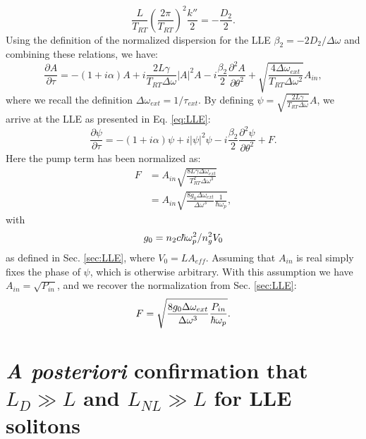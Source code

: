 \begin{equation}
\frac{L}{T_{RT}}\left(\frac{2\pi}{T_{RT}}\right)^2\frac{k''}{2}=-\frac{D_2}{2}.
\end{equation}
Using the definition of the normalized dispersion for the LLE $\beta_2=-2D_2/\Delta\omega$ and combining these relations, we have:
\begin{equation}
\frac{\partial A}{\partial\tau}=-(1+i\alpha)A+i\frac{2L\gamma}{T_{RT}\Delta\omega}|A|^2A-i\frac{\beta_2}{2}\frac{\partial^2 A}{\partial\theta^2} +\sqrt{\frac{4\Delta\omega_{ext}}{T_{RT}\Delta\omega^2}}A_{in},
\end{equation}
where we recall the definition $\Delta\omega_{ext}=1/\tau_{ext}$. By defining $\psi=\sqrt{\frac{2L\gamma}{T_{RT}\Delta\omega}}A$, we arrive at the LLE as presented in Eq. \ref{eq:LLE}:
\begin{equation}
\frac{\partial \psi}{\partial \tau}=-(1+i \alpha) \psi + i|\psi|^2 \psi -i \frac{\beta_2}{2} \frac{\partial^2 \psi}{\partial \theta^2} +F.
\end{equation}
Here the pump term has been normalized as:
\begin{align}
F&=A_{in}\sqrt{\frac{8 L \gamma \Delta\omega_{ext}}{T_{RT}^2\Delta\omega^3}}\\
&=A_{in}\sqrt{\frac{8g_0\Delta\omega_{ext}}{\Delta\omega^3}\frac{1}{\hbar\omega_p}},
\end{align}
with
\begin{equation}
g_0=n_2 c \hbar \omega_{p}^2/n_g^2 V_0
\end{equation}
as defined in Sec. \ref{sec:LLE}, where $V_0=L A_{eff}$. Assuming that $A_{in}$ is real simply fixes the phase of $\psi$, which is otherwise arbitrary. With this assumption we have $A_{in}=\sqrt{P_{in}}$, and we recover the normalization from Sec. \ref{sec:LLE}:
\begin{equation}
F=\sqrt{\frac{8 g_0\Delta\omega_{ext}}{\Delta\omega^3}\frac{P_{in}}{\hbar \omega_{p}}}.
\end{equation}

\section{\textit{A posteriori} confirmation that $L_D\gg L$ and $L_{NL}\gg L$ for LLE solitons}

